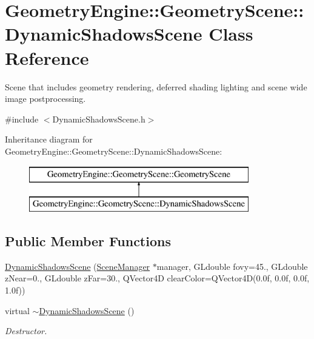 \hypertarget{class_geometry_engine_1_1_geometry_scene_1_1_dynamic_shadows_scene}{}\section{Geometry\+Engine\+::Geometry\+Scene\+::Dynamic\+Shadows\+Scene Class Reference}
\label{class_geometry_engine_1_1_geometry_scene_1_1_dynamic_shadows_scene}


Scene that includes geometry rendering, deferred shading lighting and scene wide image postprocessing.  




{\ttfamily \#include $<$Dynamic\+Shadows\+Scene.\+h$>$}

Inheritance diagram for Geometry\+Engine\+::Geometry\+Scene\+::Dynamic\+Shadows\+Scene\+:\begin{figure}[H]
\begin{center}
\leavevmode
\includegraphics[height=2.000000cm]{class_geometry_engine_1_1_geometry_scene_1_1_dynamic_shadows_scene}
\end{center}
\end{figure}
\subsection*{Public Member Functions}
\begin{DoxyCompactItemize}
\item 
\mbox{\hyperlink{class_geometry_engine_1_1_geometry_scene_1_1_dynamic_shadows_scene_a18c947328dafb4e64b8a253f5aab579d}{Dynamic\+Shadows\+Scene}} (\mbox{\hyperlink{class_geometry_engine_1_1_scene_manager}{Scene\+Manager}} $\ast$manager, G\+Ldouble fovy=45., G\+Ldouble z\+Near=0., G\+Ldouble z\+Far=30., Q\+Vector4D clear\+Color=Q\+Vector4D(0.\+0f, 0.\+0f, 0.\+0f, 1.\+0f))
\item 
\mbox{\label{class_geometry_engine_1_1_geometry_scene_1_1_dynamic_shadows_scene_a20ec3d882493f51d2caf94a6c02491e5}} 
virtual \mbox{\hyperlink{class_geometry_engine_1_1_geometry_scene_1_1_dynamic_shadows_scene_a20ec3d882493f51d2caf94a6c02491e5}{$\sim$\+Dynamic\+Shadows\+Scene}} ()
\begin{DoxyCompactList}\small\item\em Destructor. \end{DoxyCompactList}\end{DoxyCompactItemize}
